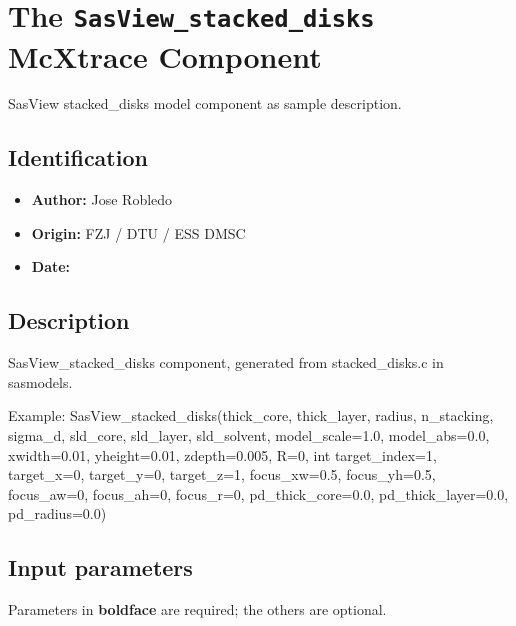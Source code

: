 \section{The \texttt{SasView\_stacked\_disks} McXtrace Component}
SasView stacked\_disks model component as sample description.

\subsection*{Identification}
\begin{itemize}
  \item \textbf{Author:} Jose Robledo
  \item \textbf{Origin:} FZJ / DTU / ESS DMSC
  \item \textbf{Date:} 
\end{itemize}

\subsection*{Description}
SasView\_stacked\_disks component, generated from stacked\_disks.c in sasmodels.

Example: SasView\_stacked\_disks(thick\_core, thick\_layer, radius, n\_stacking, sigma\_d, sld\_core, sld\_layer, sld\_solvent, model\_scale=1.0, model\_abs=0.0, xwidth=0.01, yheight=0.01, zdepth=0.005, R=0, int target\_index=1, target\_x=0, target\_y=0, target\_z=1, focus\_xw=0.5, focus\_yh=0.5, focus\_aw=0, focus\_ah=0, focus\_r=0, pd\_thick\_core=0.0, pd\_thick\_layer=0.0, pd\_radius=0.0)

\subsection*{Input parameters}
Parameters in \textbf{boldface} are required; the others are optional.

